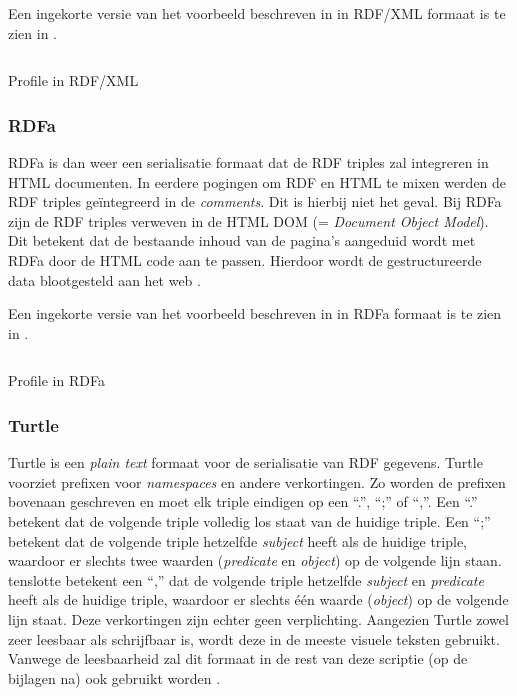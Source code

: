 Een ingekorte versie van het voorbeeld beschreven in  in RDF/XML formaat is te zien in .

\begin{listing}[ht]
    \inputminted{xml}{data/profile_short.rdf}
    \caption{Profile in RDF/XML}
    \label{listing:profile_xml}
\end{listing}


\subsubsection{RDFa}
RDFa is dan weer een serialisatie formaat dat de RDF triples zal integreren in HTML documenten. In eerdere pogingen om RDF en HTML te mixen werden de RDF triples geïntegreerd in de \textit{comments}. Dit is hierbij niet het geval. Bij RDFa zijn de RDF triples verweven in de HTML DOM (= \textit{Document Object Model}). Dit betekent dat de bestaande inhoud van de pagina's aangeduid wordt met RDFa door de HTML code aan te passen. Hierdoor wordt de gestructureerde data blootgesteld aan het web \cite{adida2012rdfa}.

Een ingekorte versie van het voorbeeld beschreven in  in RDFa formaat is te zien in .

\begin{listing}[ht]
    \inputminted{html}{data/profile_short.html}
    \caption{Profile in RDFa}
    \label{listing:profile_rdfa}
\end{listing}


\subsubsection{Turtle}
Turtle is een \textit{plain text} formaat voor de serialisatie van RDF gegevens. Turtle voorziet prefixen voor \textit{namespaces} en andere verkortingen. Zo worden de prefixen bovenaan geschreven en moet elk triple eindigen op een ``.'', ``;'' of ``,''. Een ``.'' betekent dat de volgende triple volledig los staat van de huidige triple. Een ``;'' betekent dat de volgende triple hetzelfde \textit{subject} heeft als de huidige triple, waardoor er slechts twee waarden (\textit{predicate} en \textit{object}) op de volgende lijn staan. tenslotte betekent een ``,'' dat de volgende triple hetzelfde \textit{subject} en \textit{predicate} heeft als de huidige triple, waardoor er slechts één waarde (\textit{object}) op de volgende lijn staat. Deze verkortingen zijn echter geen verplichting. Aangezien Turtle zowel zeer leesbaar als schrijfbaar is, wordt deze in de meeste visuele teksten gebruikt. Vanwege de leesbaarheid zal dit formaat in de rest van deze scriptie (op de bijlagen na) ook gebruikt worden  \cite{beckett2014rdfturtle}.

